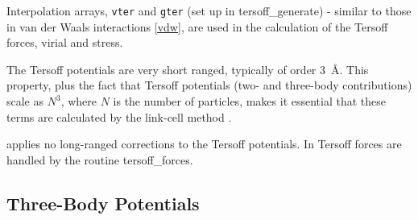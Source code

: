 Interpolation arrays, {\tt vter} and {\tt gter} (set up in
{\sc tersoff\_generate}) - similar to those in van der Waals
interactions \ref{vdw}, are used in the calculation of the Tersoff
forces, virial and stress.

The Tersoff potentials are very short
ranged, typically of order $3$~\AA.  This property, plus the fact
that Tersoff potentials (two- and
three-body contributions) scale as $N^{3}$, where $N$ is the number
of particles, makes it essential that these terms are calculated by
the link-cell method \cite{eastwood-80a}.

\D applies no long-ranged corrections to the
Tersoff potentials.  In \D Tersoff forces
are handled by the routine {\sc tersoff\_forces}.

\subsection{Three-Body Potentials}
\label{three-body}

